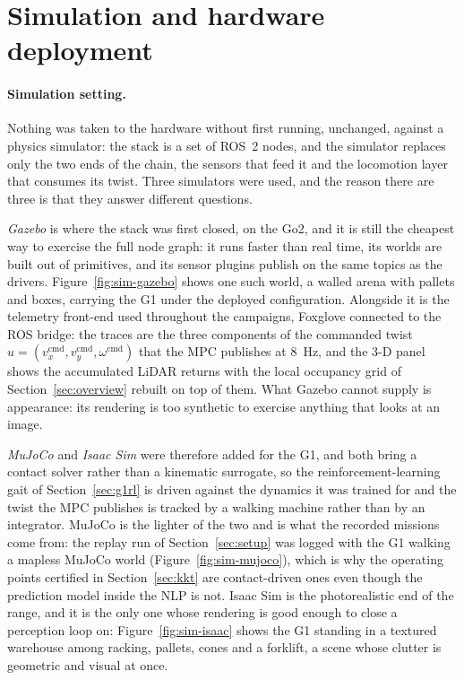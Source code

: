 \documentclass[11pt,a4paper]{article}
\begin{document}
\section{Simulation and hardware deployment}
\label{sec:deployment}

\paragraph{Simulation setting.} Nothing was taken to the hardware without first running, unchanged,
against a physics simulator: the stack is a set of ROS~2 nodes, and the simulator replaces only the two ends
of the chain, the sensors that feed it and the locomotion layer that consumes its twist. Three simulators
were used, and the reason there are three is that they answer different questions.

\emph{Gazebo} is where the stack was first closed, on the Go2, and it is still the cheapest way to exercise
the full node graph: it runs faster than real time, its worlds are built out of primitives, and its sensor
plugins publish on the same topics as the drivers. Figure~\ref{fig:sim-gazebo} shows one such world, a walled
arena with pallets and boxes, carrying the G1 under the deployed configuration. Alongside it is the telemetry
front-end used throughout the campaigns, Foxglove connected to the ROS bridge: the traces are the three
components of the commanded twist $u=(v_x^{\mathrm{cmd}},v_y^{\mathrm{cmd}},\omega^{\mathrm{cmd}})$ that the
MPC publishes at $8$~Hz, and the 3-D panel shows the accumulated LiDAR returns with the local occupancy grid
of Section~\ref{sec:overview} rebuilt on top of them. What Gazebo cannot supply is appearance: its rendering
is too synthetic to exercise anything that looks at an image.

\emph{MuJoCo} and \emph{Isaac Sim} were therefore added for the G1, and both bring a contact solver rather
than a kinematic surrogate, so the reinforcement-learning gait of Section~\ref{sec:g1rl} is driven against
the dynamics it was trained for and the twist the MPC publishes is tracked by a walking machine rather than
by an integrator. MuJoCo is the lighter of the two and is what the recorded missions come from: the replay
run of Section~\ref{sec:setup} was logged with the G1 walking a mapless MuJoCo world
(Figure~\ref{fig:sim-mujoco}), which is why the operating points certified in Section~\ref{sec:kkt} are
contact-driven ones even though the prediction model inside the NLP is not. Isaac Sim is the photorealistic
end of the range, and it is the only one whose rendering is good enough to close a perception loop on:
Figure~\ref{fig:sim-isaac} shows the G1 standing in a textured warehouse among racking, pallets, cones and a
forklift, a scene whose clutter is geometric and visual at once.
\end{document}
